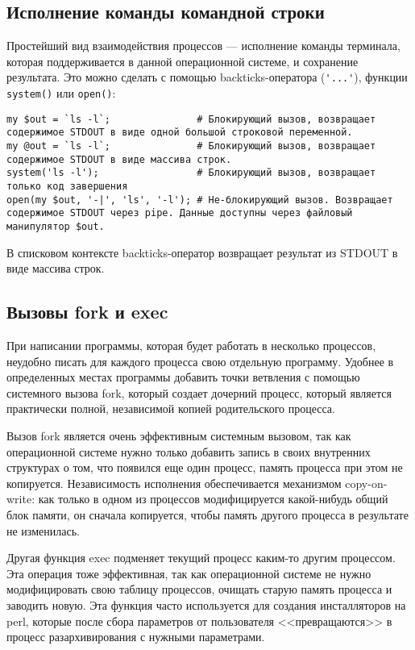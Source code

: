 \subsection{Исполнение команды командной строки}
Простейший вид взаимодействия процессов --- исполнение команды терминала, которая поддерживается в данной операционной системе, и сохранение результата. Это можно сделать с помощью backticks-оператора (\verb|'...'|), функции \verb|system()| или \verb|open()|:
\begin{verbatim}
my $out = `ls -l`;               # Блокирующий вызов, возвращает содержимое STDOUT в виде одной большой строковой переменной.
my @out = `ls -l`;               # Блокирующий вызов, возвращает содержимое STDOUT в виде массива строк.
system('ls -l');                 # Блокирующий вызов, возвращает только код завершения
open(my $out, '-|', 'ls', '-l'); # Не-блокирующий вызов. Возвращает содержимое STDOUT через pipe. Данные доступны через файловый манипулятор $out.
\end{verbatim}
В списковом контексте backticks-оператор возвращает результат из STDOUT в виде массива строк.

\subsection{Вызовы fork и exec}
При написании программы, которая будет работать в несколько процессов, неудобно писать для каждого процесса свою отдельную программу. Удобнее в определенных местах программы добавить точки ветвления с помощью системного вызова fork, который создает дочерний процесс, который является практически полной, независимой копией родительского процесса.

Вызов fork является очень эффективным системным вызовом, так как операционной системе нужно только добавить запись в своих внутренних структурах о том, что появился еще один процесс, память процесса при этом не копируется. Независимость исполнения обеспечивается механизмом copy-on-write: как только в одном из процессов модифицируется какой-нибудь общий блок памяти, он сначала копируется, чтобы память другого процесса в результате не изменилась.

Другая функция exec подменяет текущий процесс каким-то другим процессом. Эта операция тоже эффективная, так как операционной системе не нужно модифицировать свою таблицу процессов, очищать старую память процесса и заводить новую. Эта функция часто используется для создания инсталляторов на perl, которые после сбора параметров от пользователя <<превращаются>> в процесс разархивирования с нужными параметрами.

